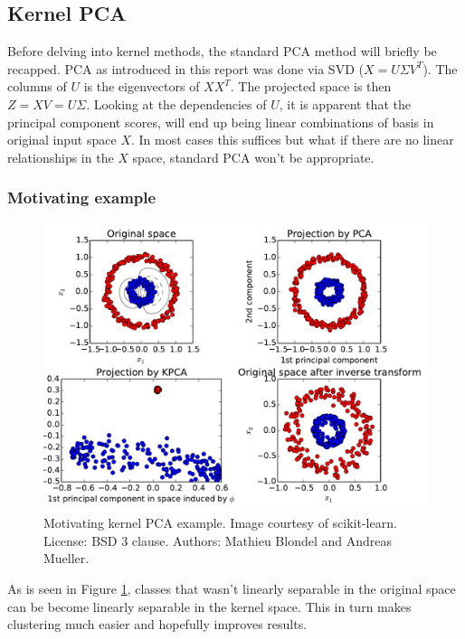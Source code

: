 \subsection{Kernel PCA}

Before delving into kernel methods, the standard PCA method will briefly be recapped.
PCA as introduced in this report was done via SVD ($X = U\Sigma V^T$). The columns of $U$ is the eigenvectors of $XX^T$. The projected space is then $Z = XV = U\Sigma$. 
Looking at the dependencies of $U$, it is apparent that the principal component scores, will end up being linear combinations of basis in original input space $X$. 
In most cases this suffices but what if there are no linear relationships in the $X$ space, standard PCA won't be appropriate.

\subsubsection{Motivating example}
\begin{figure}[H]
	\center
	\includegraphics[width=\textwidth]{figures/kernel-pca-example}
	\caption{Motivating kernel PCA example. Image courtesy of scikit-learn. License: BSD 3 clause. Authors: Mathieu Blondel and Andreas Mueller.}
	\label{fig:kernel-pca-example}
\end{figure}

As is seen in Figure \ref{fig:kernel-pca-example}, classes that wasn't linearly separable in the original space can be become linearly separable in the kernel space. This in turn makes clustering much easier and hopefully improves results.

